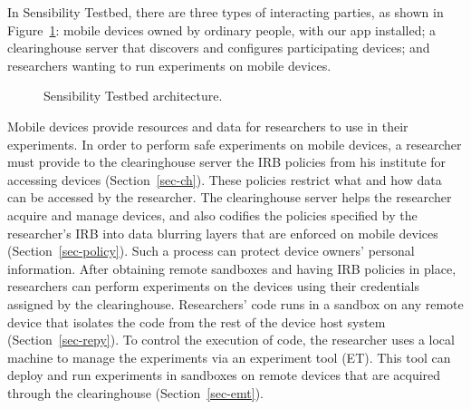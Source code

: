 In Sensibility Testbed, there are three types of interacting
parties, as shown in Figure~\ref{fig-arch}: mobile devices 
owned by ordinary people, with our app installed; a 
clearinghouse server that discovers and configures
participating devices; and researchers wanting to run
experiments on mobile devices. 

\begin{figure}
\caption{\small Sensibility Testbed architecture. 
\label{fig-arch}}
\end{figure}

Mobile devices
provide resources and data for researchers to use in their
experiments. In order to perform safe experiments on mobile
devices, a researcher must provide to the clearinghouse server
the IRB policies from his institute for accessing devices 
(Section~\ref{sec-ch}).  These 
policies restrict what and how data can be accessed by the 
researcher. The
clearinghouse server helps the researcher acquire and manage
devices, and also codifies the policies specified by the
researcher's IRB into data blurring layers that are enforced on
mobile devices (Section~\ref{sec-policy}). Such a process can protect device
owners' personal information. After obtaining remote sandboxes
and having IRB policies in place, researchers can perform
experiments on the devices using their credentials assigned by
the clearinghouse. Researchers' code runs in a sandbox on any
remote device that isolates the code from the rest of the device
host system (Section~\ref{sec-repy}). To control the execution of 
code, the researcher uses a local machine to manage the 
experiments via an experiment tool (ET). This tool can deploy 
and run experiments in sandboxes on remote devices that are 
acquired through the clearinghouse (Section~\ref{sec-emt}).

